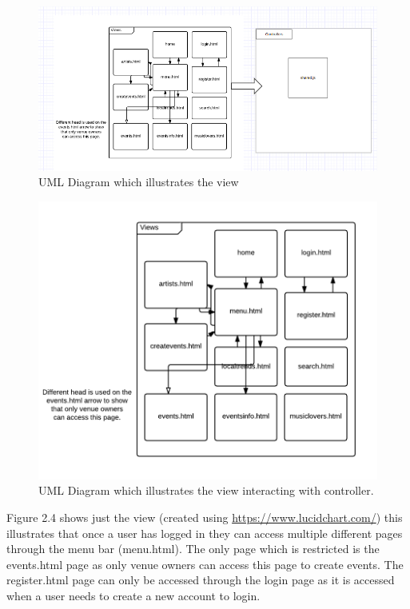 \begin{figure}[H]
\includegraphics[width=\textwidth,height=\textheight,keepaspectratio]{images/systemdesign}
\caption{UML Diagram which illustrates the view}
\end{figure}
\begin{figure}[H]
\includegraphics[width=\textwidth,height=\textheight,keepaspectratio]{images/va}
\caption{UML Diagram which illustrates the view interacting with controller.}
\end{figure}
Figure 2.4 shows just the view (created using \url{https://www.lucidchart.com/}) this illustrates that once a user has logged in they can access multiple different pages through the menu bar (menu.html). The only page which is restricted is the events.html page as only venue owners can access this page to create events. The register.html page can only be accessed through the login page as it is accessed when a user needs to create a new account to login.

